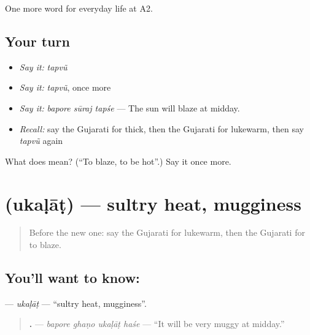 \begin{grammarlens}[title={What you've built}]
One more word for everyday life at A2.
\end{grammarlens}

\subsection*{Your turn}
\begin{itemize}
\raggedright
  \item \emph{Say it:} \emph{tapvũ}
  \item \emph{Say it:} \emph{tapvũ}, once more
  \item \emph{Say it:} \emph{bapore sūraj tapśe} — The sun will blaze at midday.
  \item \emph{Recall:} say the Gujarati for thick, then the Gujarati for lukewarm, then say \emph{tapvũ} again
\end{itemize}

\begin{tcolorbox}[breakable,colback=teal!4,colframe=teal!35!black,title={Before you move on}]
What does  mean? (\textquotedblleft{}To blaze, to be hot\textquotedblright{}.) Say it once more.
\end{tcolorbox}
\section[\texorpdfstring{\gu{ઉકળાટ} (ukaḷāṭ)}{ઉકળાટ (ukaḷāṭ)}]{ (ukaḷāṭ) — sultry heat, mugginess}

\label{lesson:GU-C216-ukalat}



\begin{quote}
Before the new one: say the Gujarati for lukewarm, then the Gujarati for to blaze.
\end{quote}

\subsection*{You'll want to know: }
\textbf{} — \emph{ukaḷāṭ} — \textquotedblleft{}sultry heat, mugginess\textquotedblright{}.

\begin{quote}
\textbf{   .} — \emph{bapore ghaṇo ukaḷāṭ haśe} — \textquotedblleft{}It will be very muggy at midday.\textquotedblright{}
\end{quote}

